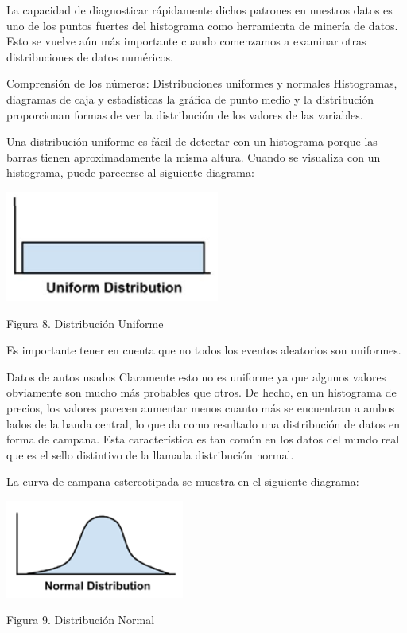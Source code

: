 \documentclass[
  letterpaper,
  DIV=11,
  numbers=noendperiod]{scrartcl}
\begin{document}
La capacidad de diagnosticar rápidamente dichos patrones en nuestros
datos es uno de los puntos fuertes del histograma como herramienta de
minería de datos. Esto se vuelve aún más importante cuando comenzamos a
examinar otras distribuciones de datos numéricos.

Comprensión de los números: Distribuciones uniformes y normales
Histogramas, diagramas de caja y estadísticas la gráfica de punto medio
y la distribución proporcionan formas de ver la distribución de los
valores de las variables.

Una distribución uniforme es fácil de detectar con un histograma porque
las barras tienen aproximadamente la misma altura. Cuando se visualiza
con un histograma, puede parecerse al siguiente diagrama:

\begin{Figura 8. Distribución Uniforme}

{\centering \includegraphics{cap8.png}

}

\caption{Figura 8. Distribución Uniforme}

\end{Figura 8. Distribución Uniforme}

Es importante tener en cuenta que no todos los eventos aleatorios son
uniformes.

Datos de autos usados \hspace{0pt}\hspace{0pt}Claramente esto no es
uniforme ya que algunos valores obviamente son mucho más probables que
otros. De hecho, en un histograma de precios, los valores parecen
aumentar menos cuanto más se encuentran a ambos lados de la banda
central, lo que da como resultado una distribución de datos en forma de
campana. Esta característica es tan común en los datos del mundo real
que es el sello distintivo de la llamada distribución normal.

La curva de campana estereotipada se muestra en el siguiente diagrama:

\begin{Figura 9. Distribución Normal}

{\centering \includegraphics{cap9.png}

}

\caption{Figura 9. Distribución Normal}

\end{Figura 9. Distribución Normal}
\end{document}
